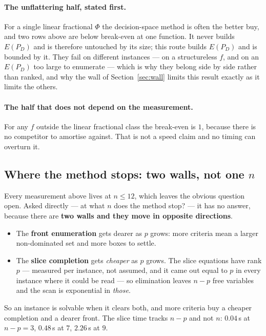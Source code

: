 \documentclass[11pt,a4paper]{article}
\newcommand{\Dset}{D}
\newcommand{\E}{E(P_{\Dset})}
\begin{document}
\paragraph{The unflattering half, stated first.}
For a single linear fractional $\Phi$ the decision-space method is often the
better buy, and two rows above are below break-even at one function.  It never
builds $\E$ and is therefore untouched by its size; this route builds $\E$ and
is bounded by it.  They fail on different instances --- on a structureless $f$,
and on an $\E$ too large to enumerate --- which is why they belong side by side
rather than ranked, and why the wall of Section~\ref{sec:wall} limits this
result exactly as it limits the others.

\paragraph{The half that does not depend on the measurement.}
For any $f$ outside the linear fractional class the break-even is $1$, because
there is no competitor to amortise against.  That is not a speed claim and no
timing can overturn it.

\subsection{Where the method stops: two walls, not one $n$}
\label{sec:walls}

Every measurement above lives at $n \leqslant 12$, which leaves the obvious
question open.  Asked directly --- at what $n$ does the method stop? --- it has
no answer, because there are \textbf{two walls and they move in opposite
directions}.

\begin{itemize}
\item The \textbf{front enumeration} gets dearer as $p$ grows: more criteria
      mean a larger non-dominated set and more boxes to settle.
\item The \textbf{slice completion} gets \emph{cheaper} as $p$ grows.  The
      slice equations have rank $p$ --- measured per instance, not assumed, and
      it came out equal to $p$ in every instance where it could be read --- so
      elimination leaves $n - p$ free variables and the scan is exponential in
      \emph{those}.
\end{itemize}

\noindent
So an instance is solvable when it clears both, and more criteria buy a cheaper
completion and a dearer front.  The slice time tracks $n-p$ and not $n$:
$0.04$\,s at $n-p=3$, $0.48$\,s at $7$, $2.26$\,s at $9$.
\end{document}
